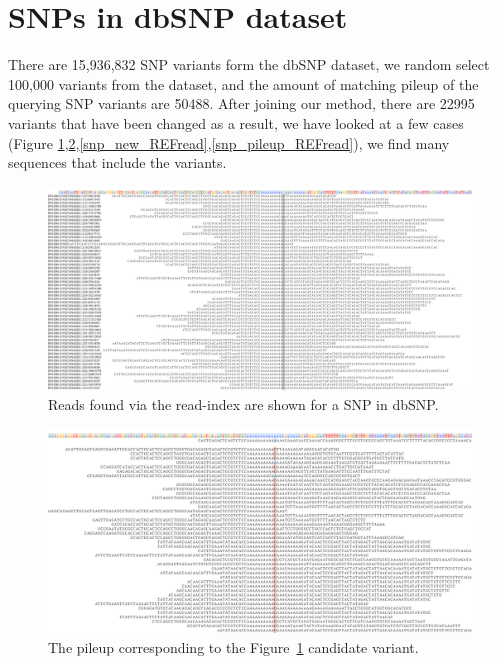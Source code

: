 \section{SNPs in dbSNP dataset}

There are 15,936,832 SNP variants form the dbSNP dataset, we random select 100,000 variants from the dataset, and the amount of matching pileup of the querying SNP variants are 50488. After joining our method, there are 22995 variants that have been changed as a result, we have looked at a few cases (Figure \ref{snp_new_ALTread},\ref{snp_pileup_ALTread},\ref{snp_new_REFread},\ref{snp_pileup_REFread}), we find many sequences that include the variants.


\begin{figure}[H]
\includegraphics[width=1\columnwidth]{body/image/snp_new_ALTread.png}
\caption[SNP match reads]{Reads found via the read-index are shown for a SNP in dbSNP.}
\label{snp_new_ALTread}
\end{figure}

\begin{figure}[H]
\includegraphics[width=1\columnwidth]{body/image/snp_pileup_ALTread.png}
\caption[Figure~\ref{snp_new_ALTread} pileup]{The pileup corresponding to the Figure~\ref{snp_new_ALTread} candidate variant.}
\label{snp_pileup_ALTread}
\end{figure}

